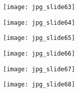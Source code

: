 \documentclass[main.tex]{subfiles}
\begin{document}
\begin{center}
\texttt{[image: jpg\_slide63]}
\end{center}

\begin{center}
\texttt{[image: jpg\_slide64]}
\end{center}

\begin{center}
\texttt{[image: jpg\_slide65]}
\end{center}

\begin{center}
\texttt{[image: jpg\_slide66]}
\end{center}

\begin{center}
\texttt{[image: jpg\_slide67]}
\end{center}

\begin{center}
\texttt{[image: jpg\_slide68]}
\end{center}
\end{document}
